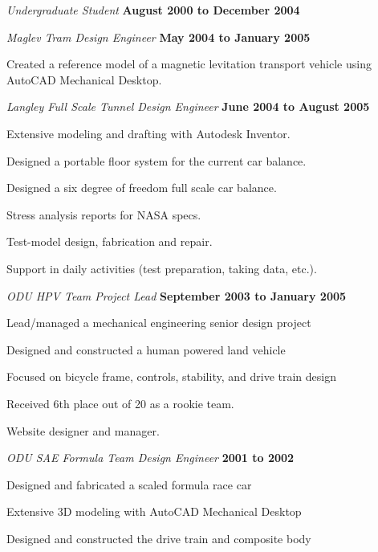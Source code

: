 \documentclass[10pt]{article}
\newenvironment{outerlist}[1][\enskip\textbullet]%
        {\begin{itemize}[#1]}{\end{itemize}%
         \vspace{-.6\baselineskip}}
\newenvironment{innerlist}[1][\enskip\textbullet]%
        {\begin{compactitem}[#1]}{\end{compactitem}}
\begin{document}
\begin{outerlist}
\item[] \textit{Undergraduate Student}%
        \hfill \textbf{August 2000 to December 2004}
        
\item[] \textit{Maglev Tram Design Engineer}%
        \hfill \textbf{May 2004 to January 2005}
        \begin{innerlist}
\item Created a reference model of a magnetic levitation transport vehicle using AutoCAD Mechanical Desktop.
\end{innerlist}

\item[] \textit{Langley Full Scale Tunnel Design Engineer}%
        \hfill \textbf{June 2004 to August 2005}
        \begin{innerlist}
\item Extensive modeling and drafting with Autodesk Inventor.
\item Designed a portable floor system for the current car balance.
\item Designed a six degree of freedom full scale car balance.
\item Stress analysis reports for NASA specs.
\item Test-model design, fabrication and repair.
\item Support in daily activities (test preparation, taking data, etc.).
\end{innerlist}

\item[] \textit{ODU HPV Team Project Lead}%
        \hfill \textbf{September 2003 to January 2005}
        \begin{innerlist}
\item Lead/managed a mechanical engineering senior design project
\item Designed and constructed a human powered land vehicle
\item Focused on bicycle frame, controls, stability, and drive train design
\item Received 6th place out of 20 as a rookie team.
\item Website designer and manager.
\end{innerlist}

\item[] \textit{ODU SAE Formula Team Design Engineer}%
        \hfill \textbf{2001 to 2002}
        \begin{innerlist}
\item Designed and fabricated a scaled formula race car
\item Extensive 3D modeling with AutoCAD Mechanical Desktop
\item Designed and constructed the drive train and composite body
\end{innerlist}

\end{outerlist}
\end{document}
